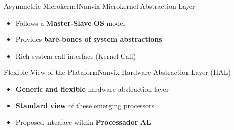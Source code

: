 		\begin{frame}[fragile]{Asymmetric Microkernel}{Nanvix Microkernel Abstraction Layer}

			\begin{itemize}
				\item Follows a \textbf{Master-Slave OS} model
				\item Provides \textbf{bare-bones of system abstractions}
				\item Rich system call interface (Kernel Call)
			\end{itemize}


		\end{frame}

		\begin{frame}[fragile]{Flexible View of the Plataform}{Nanvix Hardware Abstraction Layer (HAL)}

			\begin{itemize}
				\item \textbf{Generic and flexible} hardware abstraction layer
				\item \textbf{Standard view} of these emerging processors
				\item Proposed interface within \textbf{Processador AL}
			\end{itemize}


		\end{frame}

